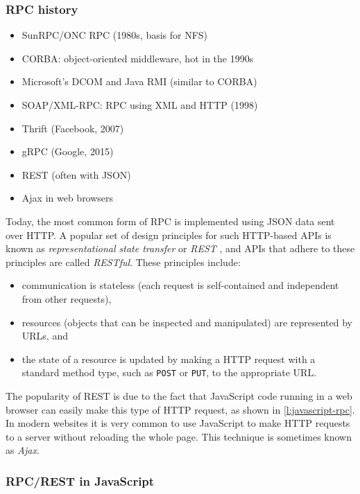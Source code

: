 \begin{frame}
    \label{s:rpc-history}
    \frametitle{RPC history}
    \begin{itemize}
        \item SunRPC/ONC RPC (1980s, basis for NFS)
        \item CORBA: object-oriented middleware, hot in the 1990s
        \item Microsoft's DCOM and Java RMI (similar to CORBA)
        \item SOAP/XML-RPC: RPC using XML and HTTP (1998)
        \item Thrift (Facebook, 2007)
        \item gRPC (Google, 2015)
        \item REST (often with JSON)
        \item Ajax in web browsers
    \end{itemize}
\end{frame}

Today, the most common form of RPC is implemented using JSON data sent over HTTP.
A popular set of design principles for such HTTP-based APIs is known as \emph{representational state transfer} or \emph{REST} \citep{Fielding:2000}, and APIs that adhere to these principles are called \emph{RESTful}.
These principles include:
\begin{itemize}
    \item communication is stateless (each request is self-contained and independent from other requests),
    \item resources (objects that can be inspected and manipulated) are represented by URLs, and
    \item the state of a resource is updated by making a HTTP request with a standard method type, such as \texttt{POST} or \texttt{PUT}, to the appropriate URL.
\end{itemize}
The popularity of REST is due to the fact that JavaScript code running in a web browser can easily make this type of HTTP request, as shown in \autoref{l:javascript-rpc}.
In modern websites it is very common to use JavaScript to make HTTP requests to a server without reloading the whole page.
This technique is sometimes known as \emph{Ajax}.


\begin{frame}
    \label{s:javascript-rpc}
    \frametitle{RPC/REST in JavaScript}
    \inputminted{js}{code/payment-rpc.js}
\end{frame}
\label{l:javascript-rpc}

